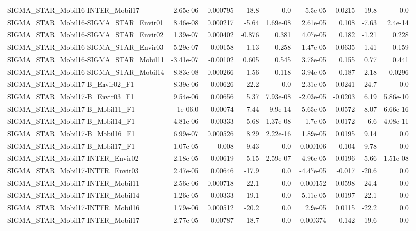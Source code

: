 \begin{tabular}{lrrrrrrrr}
SIGMA_STAR_Mobil16-INTER_Mobil17 & -2.65e-06 & -0.000795 & -18.8 & 0.0 & -5.5e-05 & -0.0215 & -19.8 & 0.0 \\
SIGMA_STAR_Mobil16-SIGMA_STAR_Envir01 & 8.46e-08 & 0.000217 & -5.64 & 1.69e-08 & 2.61e-05 & 0.108 & -7.63 & 2.4e-14 \\
SIGMA_STAR_Mobil16-SIGMA_STAR_Envir02 & 1.39e-07 & 0.000402 & -0.876 & 0.381 & 4.07e-05 & 0.182 & -1.21 & 0.228 \\
SIGMA_STAR_Mobil16-SIGMA_STAR_Envir03 & -5.29e-07 & -0.00158 & 1.13 & 0.258 & 1.47e-05 & 0.0635 & 1.41 & 0.159 \\
SIGMA_STAR_Mobil16-SIGMA_STAR_Mobil11 & -3.41e-07 & -0.00102 & 0.605 & 0.545 & 3.78e-05 & 0.155 & 0.77 & 0.441 \\
SIGMA_STAR_Mobil16-SIGMA_STAR_Mobil14 & 8.83e-08 & 0.000266 & 1.56 & 0.118 & 3.94e-05 & 0.187 & 2.18 & 0.0296 \\
SIGMA_STAR_Mobil17-B_Envir02_F1 & -8.39e-06 & -0.00626 & 22.2 & 0.0 & -2.31e-05 & -0.0241 & 24.7 & 0.0 \\
SIGMA_STAR_Mobil17-B_Envir03_F1 & 9.54e-06 & 0.00656 & 5.37 & 7.93e-08 & -2.03e-05 & -0.0203 & 6.19 & 5.86e-10 \\
SIGMA_STAR_Mobil17-B_Mobil11_F1 & -1e-06.0 & -0.00074 & 7.44 & 9.9e-14 & -5.65e-05 & -0.0572 & 8.07 & 6.66e-16 \\
SIGMA_STAR_Mobil17-B_Mobil14_F1 & 4.81e-06 & 0.00333 & 5.68 & 1.37e-08 & -1.7e-05 & -0.0172 & 6.6 & 4.08e-11 \\
SIGMA_STAR_Mobil17-B_Mobil16_F1 & 6.99e-07 & 0.000526 & 8.29 & 2.22e-16 & 1.89e-05 & 0.0195 & 9.14 & 0.0 \\
SIGMA_STAR_Mobil17-B_Mobil17_F1 & -1.07e-05 & -0.008 & 9.43 & 0.0 & -0.000106 & -0.104 & 9.78 & 0.0 \\
SIGMA_STAR_Mobil17-INTER_Envir02 & -2.18e-05 & -0.00619 & -5.15 & 2.59e-07 & -4.96e-05 & -0.0196 & -5.66 & 1.51e-08 \\
SIGMA_STAR_Mobil17-INTER_Envir03 & 2.47e-05 & 0.00646 & -17.9 & 0.0 & -4.47e-05 & -0.017 & -20.6 & 0.0 \\
SIGMA_STAR_Mobil17-INTER_Mobil11 & -2.56e-06 & -0.000718 & -22.1 & 0.0 & -0.000152 & -0.0598 & -24.4 & 0.0 \\
SIGMA_STAR_Mobil17-INTER_Mobil14 & 1.26e-05 & 0.00333 & -19.1 & 0.0 & -5.11e-05 & -0.0197 & -22.1 & 0.0 \\
SIGMA_STAR_Mobil17-INTER_Mobil16 & 1.79e-06 & 0.000512 & -20.2 & 0.0 & 2.9e-05 & 0.0115 & -22.2 & 0.0 \\
SIGMA_STAR_Mobil17-INTER_Mobil17 & -2.77e-05 & -0.00787 & -18.7 & 0.0 & -0.000374 & -0.142 & -19.6 & 0.0 \\

\end{tabular}
